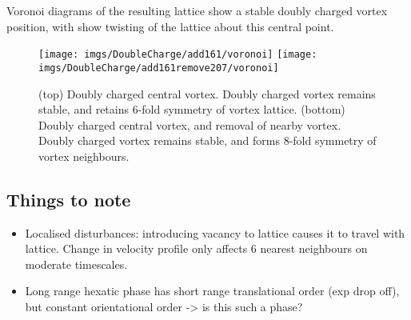 Voronoi diagrams of the resulting lattice show a stable doubly charged vortex position, with show twisting of the lattice about this central
point.

\begin{figure}[tb]
	\texttt{[image: imgs/DoubleCharge/add161/voronoi]}
	\texttt{[image: imgs/DoubleCharge/add161remove207/voronoi]}
	\caption{(top) Doubly charged central vortex. Doubly charged vortex remains stable, and retains 6-fold
	symmetry of vortex lattice. (bottom) Doubly charged central vortex, and removal of nearby vortex. Doubly charged vortex remains stable, and forms 8-fold
	symmetry of vortex neighbours.}
	\label{fig:voronoi_double}
\end{figure}



\subsection{Things to note}

\begin{itemize}
\item Localised disturbances: introducing vacancy to lattice causes it to travel with lattice. Change in velocity profile only affects 6
nearest neighbours on moderate timescales.
\item Long range hexatic phase has short range translational order (exp drop off), but constant orientational order -> is this such a phase?
\end{itemize}


